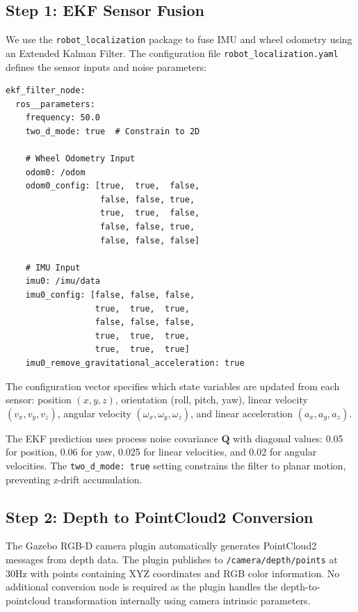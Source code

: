 \documentclass[conference]{IEEEtran}
\begin{document}
\subsection{Step 1: EKF Sensor Fusion}

We use the \texttt{robot\_localization} package to fuse IMU and wheel odometry using an Extended Kalman Filter. The configuration file \texttt{robot\_localization.yaml} defines the sensor inputs and noise parameters:

\begin{lstlisting}[caption={EKF Configuration (robot\_localization.yaml)}]
ekf_filter_node:
  ros__parameters:
    frequency: 50.0
    two_d_mode: true  # Constrain to 2D

    # Wheel Odometry Input
    odom0: /odom
    odom0_config: [true,  true,  false,
                   false, false, true,
                   true,  true,  false,
                   false, false, true,
                   false, false, false]

    # IMU Input
    imu0: /imu/data
    imu0_config: [false, false, false,
                  true,  true,  true,
                  false, false, false,
                  true,  true,  true,
                  true,  true,  true]
    imu0_remove_gravitational_acceleration: true
\end{lstlisting}

The configuration vector specifies which state variables are updated from each sensor: position $(x,y,z)$, orientation (roll, pitch, yaw), linear velocity $(v_x, v_y, v_z)$, angular velocity $(\omega_x, \omega_y, \omega_z)$, and linear acceleration $(a_x, a_y, a_z)$.

The EKF prediction uses process noise covariance $\mathbf{Q}$ with diagonal values: 0.05 for position, 0.06 for yaw, 0.025 for linear velocities, and 0.02 for angular velocities. The \texttt{two\_d\_mode: true} setting constrains the filter to planar motion, preventing z-drift accumulation.

\subsection{Step 2: Depth to PointCloud2 Conversion}

The Gazebo RGB-D camera plugin automatically generates PointCloud2 messages from depth data. The plugin publishes to \texttt{/camera/depth/points} at 30Hz with points containing XYZ coordinates and RGB color information. No additional conversion node is required as the plugin handles the depth-to-pointcloud transformation internally using camera intrinsic parameters.
\end{document}
